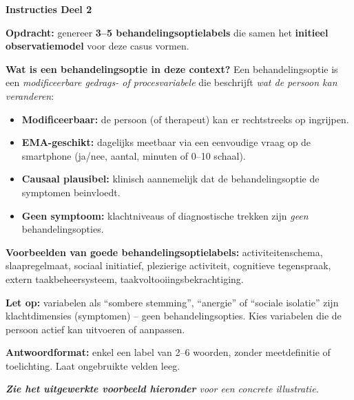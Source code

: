 \documentclass[11pt,a4paper]{article}
\begin{document}
\begin{tcolorbox}[colback=green!3,colframe=ForestGreen,arc=2.5mm,boxrule=0.9pt,
  left=10pt,right=10pt,top=9pt,bottom=9pt]
\textbf{\color{ForestGreen}Instructies Deel 2}

\smallskip\small
\textbf{Opdracht:} genereer \textbf{3--5 behandelingsoptielabels} die samen het
\textbf{initieel observatiemodel} voor deze casus vormen.

\textbf{Wat is een behandelingsoptie in deze context?}
Een behandelingsoptie is een \emph{modificeerbare gedrags- of procesvariabele} die beschrijft
\emph{wat de persoon kan veranderen}:
\begin{itemize}[topsep=2pt,itemsep=1pt]
\item \textbf{Modificeerbaar:} de persoon (of therapeut) kan er rechtstreeks op ingrijpen.
\item \textbf{EMA-geschikt:} dagelijks meetbaar via een eenvoudige vraag op de smartphone
(ja/nee, aantal, minuten of 0--10 schaal).
\item \textbf{Causaal plausibel:} klinisch aannemelijk dat de behandelingsoptie de symptomen beinvloedt.
\item \textbf{Geen symptoom:} klachtniveaus of diagnostische trekken zijn
\emph{geen} behandelingsopties.
\end{itemize}

\textbf{Voorbeelden van goede behandelingsoptielabels:}
activiteitenschema, slaapregelmaat, sociaal initiatief, plezierige activiteit,
cognitieve tegenspraak, extern taakbeheersysteem, taakvoltooiingsbekrachtiging.

\textbf{Let op:} variabelen als ``sombere stemming'', ``anergie'' of ``sociale isolatie'' zijn
klachtdimensies (symptomen) -- geen behandelingsopties. Kies variabelen die de persoon
actief kan uitvoeren of aanpassen.

\textbf{Antwoordformat:} enkel een label van 2--6 woorden, zonder meetdefinitie of toelichting.
Laat ongebruikte velden leeg.

\medskip
\textit{\textbf{Zie het uitgewerkte voorbeeld hieronder} voor een concrete illustratie.}
\end{tcolorbox}

\vspace{0.5em}
\nopagebreak[4]
\end{document}
